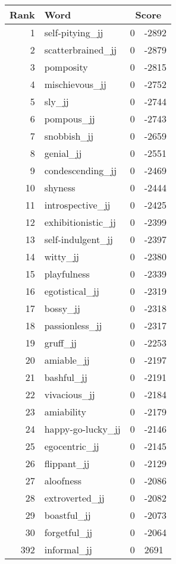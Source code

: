 \begin{longtable}[!htbp]{| rlr@{.}l |}
    \hline
    \textbf{Rank} & \textbf{Word} & \multicolumn{2}{c|}{\textbf{Score}} \\
    \hline
    \endhead
    1 & self-pitying\_jj & 0 & -2892 \\
    2 & scatterbrained\_jj & 0 & -2879 \\
    3 & pomposity & 0 & -2815 \\
    4 & mischievous\_jj & 0 & -2752 \\
    5 & sly\_jj & 0 & -2744 \\
    6 & pompous\_jj & 0 & -2743 \\
    7 & snobbish\_jj & 0 & -2659 \\
    8 & genial\_jj & 0 & -2551 \\
    9 & condescending\_jj & 0 & -2469 \\
    10 & shyness & 0 & -2444 \\
    11 & introspective\_jj & 0 & -2425 \\
    12 & exhibitionistic\_jj & 0 & -2399 \\
    13 & self-indulgent\_jj & 0 & -2397 \\
    14 & witty\_jj & 0 & -2380 \\
    15 & playfulness & 0 & -2339 \\
    16 & egotistical\_jj & 0 & -2319 \\
    17 & bossy\_jj & 0 & -2318 \\
    18 & passionless\_jj & 0 & -2317 \\
    19 & gruff\_jj & 0 & -2253 \\
    20 & amiable\_jj & 0 & -2197 \\
    21 & bashful\_jj & 0 & -2191 \\
    22 & vivacious\_jj & 0 & -2184 \\
    23 & amiability & 0 & -2179 \\
    24 & happy-go-lucky\_jj & 0 & -2146 \\
    25 & egocentric\_jj & 0 & -2145 \\
    26 & flippant\_jj & 0 & -2129 \\
    27 & aloofness & 0 & -2086 \\
    28 & extroverted\_jj & 0 & -2082 \\
    29 & boastful\_jj & 0 & -2073 \\
    30 & forgetful\_jj & 0 & -2064 \\
    392 & informal\_jj & 0 & 2691 \\

\end{longtable}
